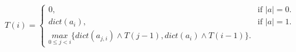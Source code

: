 \documentclass{article}
\begin{document}
	
	\begin{equation}
		T(i)=\begin{cases}
			0, & \text{if $|a|=0$}.\\
			dict(a_i), & \text{if $|a|=1$}.\\
			\underset{0 \leq j < i}{max} \{dict(a_{j,i}) \wedge T(j-1), dict(a_i) \wedge T(i-1)\}.
		\end{cases}
	\end{equation}
	
\end{document}
